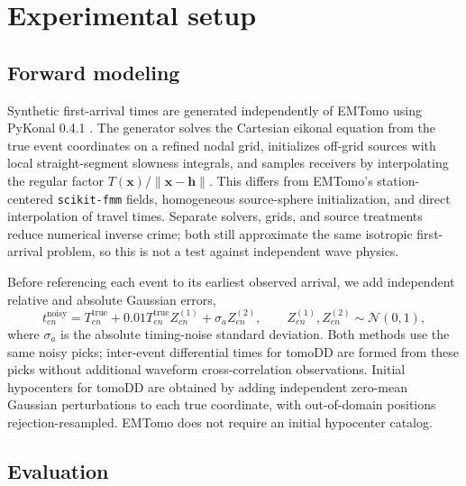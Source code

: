 \section{Experimental setup}
\label{sec:experiments}

\subsection{Forward modeling}
\label{subsec:synthetic_data}

Synthetic first-arrival times are generated independently of EMTomo using PyKonal 0.4.1 \parencite{white2020pykonal}. The generator solves the Cartesian eikonal equation from the true event coordinates on a refined nodal grid, initializes off-grid sources with local straight-segment slowness integrals, and samples receivers by interpolating the regular factor $T(\mathbf{x})/\|\mathbf{x}-\mathbf{h}\|$. This differs from EMTomo's station-centered \texttt{scikit-fmm} fields, homogeneous source-sphere initialization, and direct interpolation of travel times. Separate solvers, grids, and source treatments reduce numerical inverse crime; both still approximate the same isotropic first-arrival problem, so this is not a test against independent wave physics.

Before referencing each event to its earliest observed arrival, we add independent relative and absolute Gaussian errors,
\begin{equation}
t^{\mathrm{noisy}}_{en}=T^{\mathrm{true}}_{en}
+0.01T^{\mathrm{true}}_{en}Z^{(1)}_{en}+\sigma_a Z^{(2)}_{en},
\qquad Z^{(1)}_{en},Z^{(2)}_{en}\sim\mathcal{N}(0,1),
\end{equation}
where $\sigma_a$ is the absolute timing-noise standard deviation. Both methods use the same noisy picks; inter-event differential times for tomoDD are formed from these picks without additional waveform cross-correlation observations. Initial hypocenters for tomoDD are obtained by adding independent zero-mean Gaussian perturbations to each true coordinate, with out-of-domain positions rejection-resampled. EMTomo does not require an initial hypocenter catalog.

\subsection{Evaluation}
\label{subsec:metrics}

